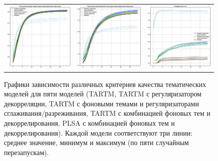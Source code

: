 \begin{figure}
\begin{tabular}{ccc}
    \includegraphics[width=55mm]{images/CH4_improved_diversity_jensenshannon_False.eps} &   \includegraphics[width=55mm]{images/CH4_improved_diversity_jensenshannon_True.eps} & \includegraphics[width=55mm]{images/CH4_improved_SparsityThetaScore.eps} \\

\end{tabular}
    \caption{Графики зависимости различных критериев качества тематических моделей для пяти моделей (TARTM, TARTM с регуляризатором декорреляции, TARTM с фоновыми темами и регуляризаторами сглаживания/разреживания, TARTM с комбинацией фоновых тем и декоррелирования, PLSA с комбинацией фоновых тем и декоррелирования). Каждой модели соответствуют три линии: среднее значение, минимум и максимум (по пяти случайным перезапускам).}
\label{fig:ch4_improved}
\end{figure}

